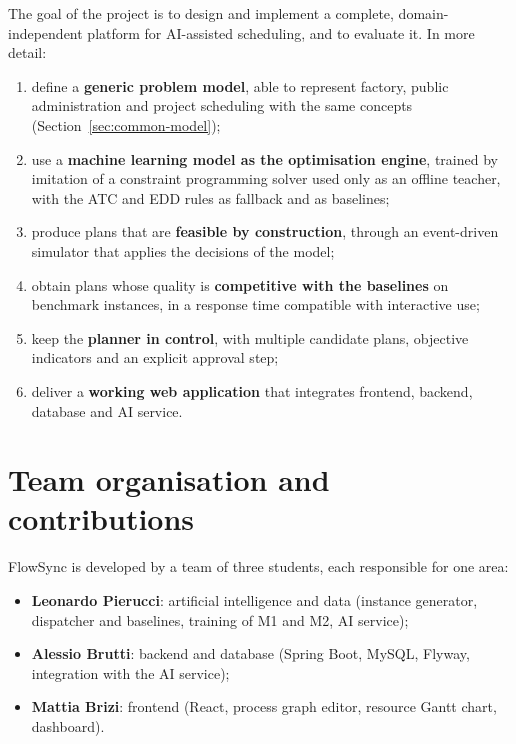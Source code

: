 The goal of the project is to design and implement a complete, domain-independent platform for
AI-assisted scheduling, and to evaluate it. In more detail:

\begin{enumerate}
  \item define a \textbf{generic problem model}, able to represent factory, public administration
        and project scheduling with the same concepts (Section~\ref{sec:common-model});
  \item use a \textbf{machine learning model as the optimisation engine}, trained by imitation
        of a constraint programming solver used only as an offline teacher, with the ATC and EDD
        rules as fallback and as baselines;
  \item produce plans that are \textbf{feasible by construction}, through an event-driven
        simulator that applies the decisions of the model;
  \item obtain plans whose quality is \textbf{competitive with the baselines} on benchmark
        instances, in a response time compatible with interactive use;
  \item keep the \textbf{planner in control}, with multiple candidate plans, objective indicators
        and an explicit approval step;
  \item deliver a \textbf{working web application} that integrates frontend, backend, database
        and AI service.
\end{enumerate}

\section{Team organisation and contributions}
\label{sec:contributions}

FlowSync is developed by a team of three students, each responsible for one area:

\begin{itemize}
  \item \textbf{Leonardo Pierucci}: artificial intelligence and data (instance generator,
        dispatcher and baselines, training of M1 and M2, AI service);
  \item \textbf{Alessio Brutti}: backend and database (Spring Boot, MySQL, Flyway,
        integration with the AI service);
  \item \textbf{Mattia Brizi}: frontend (React, process graph editor, resource Gantt chart,
        dashboard).
\end{itemize}

